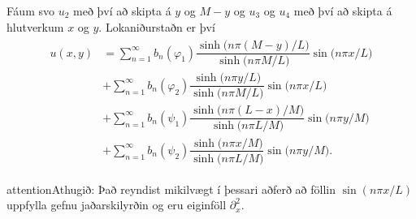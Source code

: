 \documentclass[a4paper,10pt,icelandic]{sphinxmanual}
\begin{document}
Fáum svo \(u_2\) með því að skipta á
\(y\) og \(M-y\) og \(u_3\) og \(u_4\) með því að skipta á hlutverkum \(x\) og
\(y\). Lokaniðurstaðn er því
\begin{equation*}
\begin{split}\begin{aligned}
 u(x,y)&=\sum\limits_{n=1}^\infty
 b_n(\varphi_1)
 \dfrac{\sinh\big(n\pi(M-y)/L\big)}{\sinh\big(n\pi M/L\big)}
 \sin\big(n\pi x/L\big)\\
 &+\sum\limits_{n=1}^\infty
 b_n(\varphi_2)
 \dfrac{\sinh\big(n\pi y/L\big)}{\sinh\big(n\pi M/L\big)}
 \sin\big(n\pi x/L\big)\nonumber\\
 &+\sum\limits_{n=1}^\infty
 b_n(\psi_1)
 \dfrac{\sinh\big(n\pi (L-x)/M\big)}{\sinh\big(n\pi L/M\big)}
 \sin\big(n\pi y/M\big)\nonumber\\
 &+\sum\limits_{n=1}^\infty
 b_n(\psi_2)
 \dfrac{\sinh\big(n\pi x/M\big)}{\sinh\big(n\pi L/M\big)}
 \sin\big(n\pi y/M\big).\nonumber\end{aligned}\end{split}
\end{equation*}
\begin{sphinxadmonition}{attention}{Athugið:}
Það reyndist mikilvægt í þessari aðferð að föllin \(\sin(n{\pi}x/L)\) uppfylla gefnu jaðarskilyrðin og eru eiginföll \(\partial_x^2\).
\end{sphinxadmonition}
\end{document}

